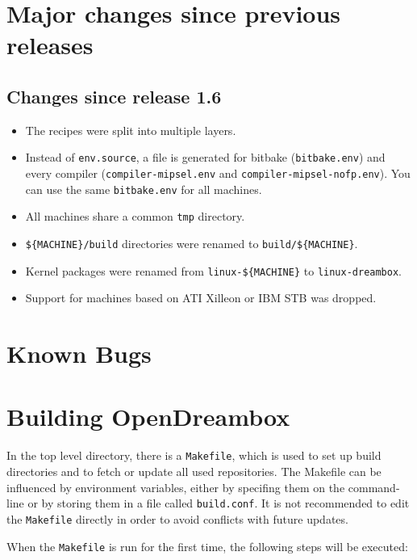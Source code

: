 \documentclass[a4paper]{article}
\newcommand{\shell}[1]{\texttt{\small #1}}
\begin{document}
\pagebreak

\section{Major changes since previous releases}

  \subsection{Changes since release 1.6}
    \begin{itemize}
      \item The recipes were split into multiple layers.
      \item Instead of \shell{env.source}, a file is generated for bitbake
        (\shell{bitbake.env}) and every compiler (\shell{compiler-mipsel.env}
        and \shell{compiler-mipsel-nofp.env}). You can use the same
        \shell{bitbake.env} for all machines.
      \item All machines share a common \shell{tmp} directory.
      \item \shell{\$\{MACHINE\}/build} directories were renamed to \shell{build/\$\{MACHINE\}}.
      \item Kernel packages were renamed from \shell{linux-\$\{MACHINE\}} to \shell{linux-dreambox}.
      \item Support for machines based on ATI Xilleon or IBM STB was dropped.
    \end{itemize}

\section{Known Bugs}

\pagebreak

\section{Building OpenDreambox}

  In the top level directory, there is a \shell{Makefile}, which is used to
  set up build directories and to fetch or update all used repositories.
  The Makefile can be influenced by environment variables, either
  by specifing them on the command-line or by storing them in a file called
  \shell{build.conf}. It is not recommended to edit the \shell{Makefile} directly
  in order to avoid conflicts with future updates.

  When the \shell{Makefile} is run for the first time, the following steps will
  be executed:
\end{document}
